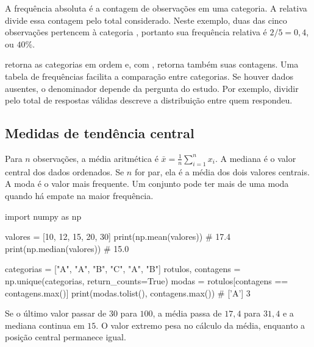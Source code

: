 A frequência absoluta é a contagem de observações em uma categoria. A relativa divide essa contagem pelo total considerado. Neste exemplo, duas das cinco observações pertencem à categoria , portanto sua frequência relativa é \(2/5=0{,}4\), ou \(40\%\).


 retorna as categorias em ordem e, com , retorna também suas contagens. Uma tabela de frequências facilita a comparação entre categorias. Se houver dados ausentes, o denominador depende da pergunta do estudo. Por exemplo, dividir pelo total de respostas válidas descreve a distribuição entre quem respondeu.

\subsection{Medidas de tendência central}

Para \(n\) observações, a média aritmética é \(\bar{x}=\frac{1}{n}\sum_{i=1}^n x_i\). A mediana é o valor central dos dados ordenados. Se \(n\) for par, ela é a média dos dois valores centrais. A moda é o valor mais frequente. Um conjunto pode ter mais de uma moda quando há empate na maior frequência.

\begin{exemplo}
import numpy as np

valores = [10, 12, 15, 20, 30]
print(np.mean(valores))    # 17.4
print(np.median(valores))  # 15.0

categorias = ["A", "A", "B", "C", "A", "B"]
rotulos, contagens = np.unique(categorias, return_counts=True)
modas = rotulos[contagens == contagens.max()]
print(modas.tolist(), contagens.max())  # ['A'] 3
\end{exemplo}

Se o último valor passar de \(30\) para \(100\), a média passa de \(17{,}4\) para \(31{,}4\) e a mediana continua em \(15\). O valor extremo pesa no cálculo da média, enquanto a posição central permanece igual.



